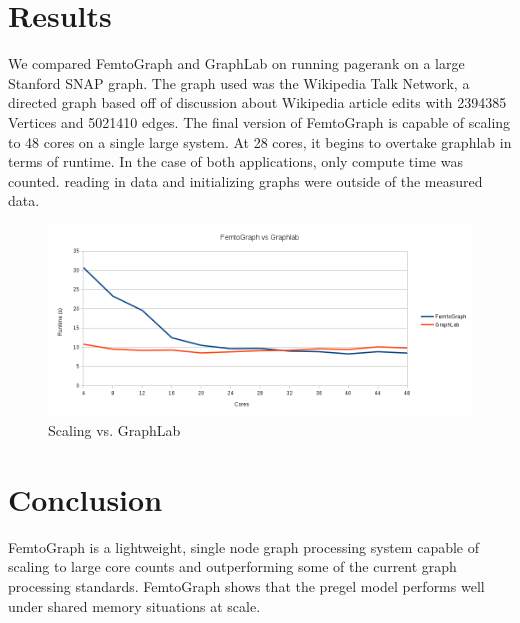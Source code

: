 \documentclass{sig-alternate-05-2015}
\begin{document}
\section{Results}
\justify
We compared FemtoGraph and  GraphLab on running pagerank on a large Stanford SNAP graph. The graph used was the Wikipedia Talk Network, a directed graph based off of discussion about Wikipedia article edits with 2394385 Vertices and 5021410 edges. \cite{snapnets} The final version of FemtoGraph is capable of scaling to 48 cores on a single large system. At 28 cores, it begins to overtake graphlab in terms of runtime. In the case of both applications, only compute time was counted. reading in data and initializing graphs were outside of the measured data. 
\begin{figure}
  \centering
  \includegraphics[width=\columnwidth]{vs.png}
  \caption{Scaling vs. GraphLab}
\end{figure}


\justify
\section{Conclusion}
FemtoGraph is a lightweight, single node graph processing system capable of scaling to large core counts and outperforming some of the current graph processing standards. FemtoGraph shows that the pregel model performs well under shared memory situations at scale.

 

%
%
\end{document}
